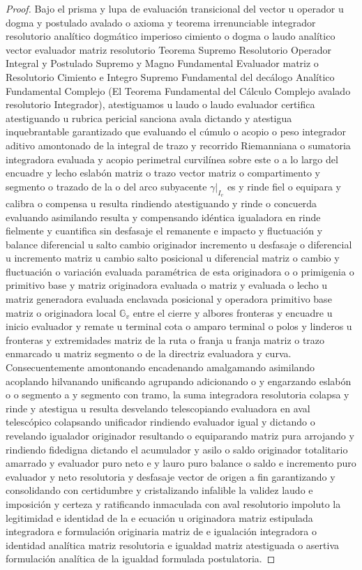 \documentclass[11pt,a4paper]{article}
\theoremstyle{definition}
\theoremstyle{remark}
\numberwithin{equation}{section}
\begin{document}
\begin{proof}
Bajo el prisma y lupa de evaluación transicional del vector u operador u dogma y postulado avalado o axioma y teorema irrenunciable integrador resolutorio analítico dogmático imperioso cimiento o dogma o laudo analítico vector evaluador matriz resolutorio Teorema Supremo Resolutorio Operador Integral y Postulado Supremo y Magno Fundamental Evaluador matriz o Resolutorio Cimiento e Integro Supremo Fundamental del decálogo Analítico Fundamental Complejo (El Teorema Fundamental del Cálculo Complejo avalado resolutorio Integrador), atestiguamos u laudo o laudo evaluador certifica atestiguando u rubrica pericial sanciona avala dictando y atestigua inquebrantable garantizado que evaluando el cúmulo o acopio o peso integrador aditivo amontonado de la integral de trazo y recorrido Riemanniana o sumatoria integradora evaluada y acopio perimetral curvilínea sobre este o a lo largo del encuadre y lecho eslabón matriz o trazo vector matriz o compartimento y segmento o trazado de la o del arco subyacente $\gamma|_{I_v}$ es y rinde fiel o equipara y calibra o compensa u resulta rindiendo atestiguando y rinde o concuerda evaluando asimilando resulta y compensando idéntica igualadora en rinde fielmente y cuantifica sin desfasaje el remanente e impacto y fluctuación y balance diferencial u salto cambio originador incremento u desfasaje o diferencial u incremento matriz u cambio salto posicional u diferencial matriz o cambio y fluctuación o variación evaluada paramétrica de esta originadora o o primigenia o primitivo base y matriz originadora evaluada o matriz y evaluada o lecho u matriz generadora evaluada enclavada posicional y operadora primitivo base matriz o originadora local $\mathbb{G}_v$ entre el cierre y albores fronteras y encuadre u inicio evaluador y remate u terminal cota o amparo terminal o polos y linderos u fronteras y extremidades matriz de la ruta o franja u franja matriz o trazo enmarcado u matriz segmento o de la directriz evaluadora y curva.
Consecuentemente amontonando encadenando amalgamando asimilando acoplando hilvanando unificando agrupando adicionando o y engarzando eslabón o o segmento a y segmento con tramo, la suma integradora resolutoria colapsa y rinde y atestigua u resulta desvelando telescopiando evaluadora en aval telescópico colapsando unificador rindiendo evaluador igual y dictando o revelando igualador originador resultando o equiparando matriz pura arrojando y rindiendo fidedigna dictando el acumulador y asilo o saldo originador totalitario amarrado y evaluador puro neto e y lauro puro balance o saldo e incremento puro evaluador y neto resolutoria y desfasaje vector de origen a fin garantizando y consolidando con certidumbre y cristalizando infalible la validez laudo e imposición y certeza y ratificando inmaculada con aval resolutorio impoluto la legitimidad e identidad de la e ecuación u originadora matriz estipulada integradora e formulación originaria matriz de e igualación integradora o identidad analítica matriz resolutoria e igualdad matriz atestiguada o asertiva formulación analítica de la igualdad formulada postulatoria.
\end{proof}
\end{document}
